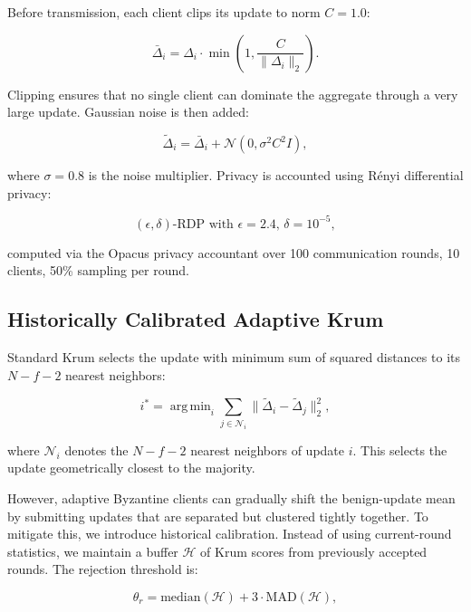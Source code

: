 \documentclass[preprint,12pt]{elsarticle}
\DeclareMathOperator*{\argmin}{arg\,min}
\begin{document}
Before transmission, each client clips its update to norm $C = 1.0$:

\begin{equation}
\bar{\Delta}_i = \Delta_i \cdot \min\left(1, \frac{C}{\|\Delta_i\|_2}\right).
\label{eq:clip}
\end{equation}

Clipping ensures that no single client can dominate the aggregate through a very large update. Gaussian noise is then added:

\begin{equation}
\tilde{\Delta}_i = \bar{\Delta}_i + \mathcal{N}(0, \sigma^2 C^2 I),
\label{eq:noise}
\end{equation}

where $\sigma = 0.8$ is the noise multiplier. Privacy is accounted using Rényi differential privacy:

\begin{equation}
(\epsilon, \delta) \text{-RDP with } \epsilon = 2.4, \, \delta = 10^{-5},
\label{eq:rdp}
\end{equation}

computed via the Opacus privacy accountant over 100 communication rounds, 10 clients, 50\% sampling per round.

\subsection{Historically Calibrated Adaptive Krum}

Standard Krum selects the update with minimum sum of squared distances to its $N-f-2$ nearest neighbors:

\begin{equation}
i^* = \argmin_i \sum_{j \in \mathcal{N}_i} \|\tilde{\Delta}_i - \tilde{\Delta}_j\|_2^2,
\label{eq:krum}
\end{equation}

where $\mathcal{N}_i$ denotes the $N-f-2$ nearest neighbors of update $i$. This selects the update geometrically closest to the majority.

However, adaptive Byzantine clients can gradually shift the benign-update mean by submitting updates that are separated but clustered tightly together. To mitigate this, we introduce historical calibration. Instead of using current-round statistics, we maintain a buffer $\mathcal{H}$ of Krum scores from previously accepted rounds. The rejection threshold is:

\begin{equation}
\theta_r = \text{median}(\mathcal{H}) + 3 \cdot \text{MAD}(\mathcal{H}),
\label{eq:hist_threshold}
\end{equation}
\end{document}

